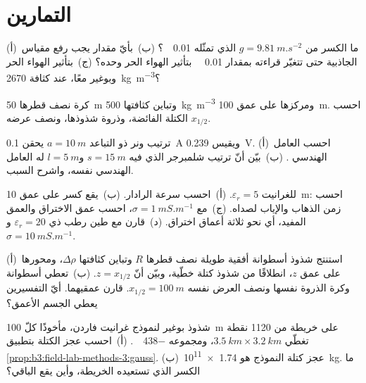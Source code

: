 \section{التمارين}

\begin{exercise}[$\star$]\label{exo:b3:field-lab-methods-3:1}
(أ)~ما الكسر من $g = \qty{9.81}{m.s^{-2}}$ الذي تمثّله \qty{0.01}{\milli\gal}؟
(ب)~بأيّ مقدار يجب رفع مقياس الجاذبية حتى تتغيّر قراءته
بمقدار \qty{0.01}{\milli\gal} بتأثير الهواء الحر وحده؟ (ج)~بتأثير
الهواء الحر وبوغير معًا، عند كثافة
\qty{2670}{kg.m^{-3}}؟
\end{exercise}

\begin{exercise}[$\star$]\label{exo:b3:field-lab-methods-3:2}
كرة نصف قطرها \qty{50}{m} وتباين كثافتها
\qty{+500}{kg.m^{-3}} ومركزها على عمق \qty{100}{m}. احسب
الكتلة الفائضة، وذروة شذوذها، ونصف عرضه $x_{1/2}$.
\end{exercise}

\begin{exercise}[$\star$]\label{exo:b3:field-lab-methods-3:3}
ترتيب ونر ذو التباعد $a = \qty{10}{m}$ يحقن \qty{0.1}{A}
ويقيس \qty{0.239}{V}. (أ)~احسب العامل الهندسي
. (ب)~بيّن أنّ ترتيب شلمبرجر الذي فيه $s =
\qty{15}{m}$ و$l = \qty{5}{m}$ له العامل الهندسي نفسه،
واشرح السبب.
\end{exercise}

\begin{exercise}[$\star$]\label{exo:b3:field-lab-methods-3:4}
للغرانيت $\varepsilon_r = 5$. (أ)~احسب سرعة الرادار. (ب)~يقع
كسر على عمق \qty{10}{m}: احسب زمن الذهاب والإياب لصداه.
(ج)~مع $\sigma = \qty{1}{mS.m^{-1}}$، احسب عمق الاختراق
والعمق المفيد، أي نحو ثلاثة أعماق اختراق. (د)~قارن مع طين رطب
ذي $\varepsilon_r = 20$ و$\sigma = \qty{10}{mS.m^{-1}}$.
\end{exercise}

\begin{exercise}[$\star\star$]\label{exo:b3:field-lab-methods-3:5}
(أ)~استنتج شذوذ أسطوانة أفقية طويلة نصف قطرها $R$ وتباين
كثافتها $\Delta\rho$، ومحورها على عمق $z$، انطلاقًا من شذوذ
كتلة خطّية، وبيّن أنّ $z = x_{1/2}$. (ب)~تعطي أسطوانة وكرة
الذروة نفسها ونصف العرض نفسه $x_{1/2} = \qty{100}{m}$.
قارن عمقيهما. أيّ التفسيرين يعطي الجسم الأعمق؟
\end{exercise}

\begin{exercise}[$\star\star$]\label{exo:b3:field-lab-methods-3:6}
شذوذ بوغير لنموذج غرانيت فاردن، مأخوذًا كلّ
\qty{100}{m} على خريطة من \num{1120} نقطة تغطّي $\qty{3.5}{km}
\times \qty{3.2}{km}$، ومجموعه \qty{-438}{\milli\gal}. (أ)~احسب
عجز الكتلة بتطبيق \cref{prop:b3:field-lab-methods-3:gauss}.
(ب)~عجز كتلة النموذج هو \qty{1.74e11}{kg}. ما الكسر الذي
تستعيده الخريطة، وأين يقع الباقي؟
\end{exercise}

